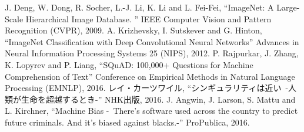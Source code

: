 \documentclass[uplatex]{jsarticle}
\begin{document}
\begin{thebibliography}{9}
   J. Deng, W. Dong, R. Socher, L.-J. Li, K. Li and L. Fei-Fei,
    ``ImageNet: A Large-Scale Hierarchical Image Database.  '' IEEE Computer Vision and Pattern Recognition (CVPR), 2009.
   A. Krizhevsky, I.  Sutskever and G. Hinton,
    ``ImageNet Classification with Deep Convolutional Neural Networks'' Advances in Neural Information Processing Systems 25 (NIPS), 2012.
   P.  Rajpurkar, J. Zhang, K. Lopyrev and P. Liang,
      ``SQuAD: 100,000+ Questions for Machine Comprehension of Text'' Conference on Empirical Methods in Natural Language Processing (EMNLP), 2016.
   レイ・カーツワイル,
      ``シンギュラリティは近い\ -人類が生命を超越するとき-'' NHK出版, 2016.
   J. Angwin, J. Larson, S. Mattu and L. Kirchner,
      ``Machine Bias -\ There's software used across the country to predict future criminals. And it’s biased against blacks.-'' ProPublica, 2016.

\end{thebibliography}

\end{document}
